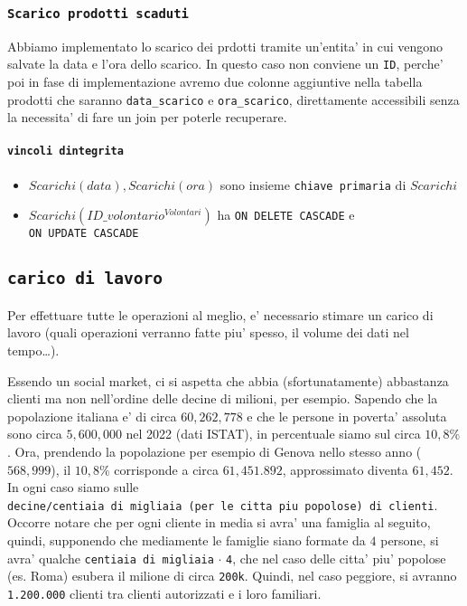 \documentclass[]{article}
\providecommand{\tightlist}{%
  \setlength{\itemsep}{0pt}\setlength{\parskip}{0pt}}
\let\oldparagraph\paragraph
\renewcommand{\paragraph}[1]{\oldparagraph{#1}\mbox{}}
\begin{document}
\hypertarget{scarico-prodotti-scaduti}{%
\subsubsection{\texorpdfstring{\texttt{Scarico\ prodotti\ scaduti}}{Scarico prodotti scaduti}}\label{scarico-prodotti-scaduti}}

Abbiamo implementato lo scarico dei prdotti tramite un'entita' in cui
vengono salvate la data e l'ora dello scarico. In questo caso non
conviene un \texttt{ID}, perche' poi in fase di implementazione avremo
due colonne aggiuntive nella tabella prodotti che saranno
\texttt{data\_scarico} e \texttt{ora\_scarico}, direttamente accessibili
senza la necessita' di fare un join per poterle recuperare.

\hypertarget{vincoli-dintegrita-7}{%
\paragraph{\texorpdfstring{\texttt{vincoli\ d\textquotesingle{}integrita\textquotesingle{}}}{vincoli d'integrita'}}\label{vincoli-dintegrita-7}}

\begin{itemize}
\tightlist
\item
  \(Scarichi(data), Scarichi(ora)\) sono insieme
  \texttt{chiave\ primaria} di \(Scarichi\)
\item
  \(Scarichi(ID\_volontario^{Volontari})\) ha
  \texttt{ON\ DELETE\ CASCADE} e \texttt{ON\ UPDATE\ CASCADE}
\end{itemize}

\hypertarget{carico-di-lavoro}{%
\subsection{\texorpdfstring{\texttt{carico\ di\ lavoro}}{carico di lavoro}}\label{carico-di-lavoro}}

Per effettuare tutte le operazioni al meglio, e' necessario stimare un
carico di lavoro (quali operazioni verranno fatte piu' spesso, il volume
dei dati nel tempo\ldots{}).

Essendo un social market, ci si aspetta che abbia (sfortunatamente)
abbastanza clienti ma non nell'ordine delle decine di milioni, per
esempio. Sapendo che la popolazione italiana e' di circa \(60,262,778\)
e che le persone in poverta' assoluta sono circa \(5,600,000\) nel 2022
(dati ISTAT), in percentuale siamo sul circa \(10,8\%\). Ora, prendendo
la popolazione per esempio di Genova nello stesso anno (\(568,999\)), il
\(10,8\%\) corrisponde a circa \(61,451.892\), approssimato diventa
\(61,452\). In ogni caso siamo sulle
\texttt{decine/centiaia\ di\ migliaia\ (per\ le\ citta\textquotesingle{}\ piu\textquotesingle{}\ popolose)\ di\ clienti}.
Occorre notare che per ogni cliente in media si avra' una famiglia al
seguito, quindi, supponendo che mediamente le famiglie siano formate da
\(4\) persone, si avra' qualche \texttt{centiaia\ di\ migliaia}
\(\cdot\) \texttt{4}, che nel caso delle citta' piu' popolose (es. Roma)
esubera il milione di circa \texttt{200k}. Quindi, nel caso peggiore, si
avranno \texttt{1.200.000} clienti tra clienti autorizzati e i loro
familiari.
\end{document}
